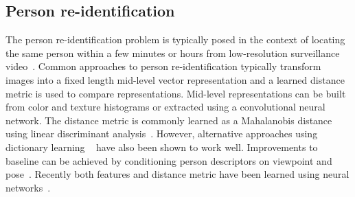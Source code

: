     \subsection{Person re-identification}
        The person re-identification problem is typically posed in the context of locating the same person within
          a few minutes or hours from low-resolution surveillance
          video~\cite{hirzer_relaxed_2012,karanam_person_2015,wu_viewpoint_2015,shi_embedding_2016}.
        Common approaches to person re-identification typically transform images into a fixed length mid-level
          vector representation and a learned distance metric is used to compare representations.
        Mid-level representations can be built from color and texture histograms or extracted using a
          convolutional neural network.
        The distance metric is commonly learned as a Mahalanobis distance using linear discriminant
          analysis~\cite{hirzer_relaxed_2012}.
        However, alternative approaches using dictionary learning ~\cite{karanam_person_2015} have also been
          shown to work well.
        Improvements to baseline can be achieved by conditioning person descriptors on viewpoint and
          pose~\cite{wu_viewpoint_2015}.
        Recently both features and distance metric have been learned using neural
          networks~\cite{shi_embedding_2016}.

